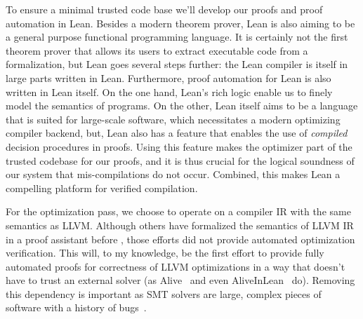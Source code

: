 \documentclass[a4paper]{scrartcl}
\begin{document}
To ensure a minimal trusted code base we'll develop our proofs and proof
automation in Lean. Besides a modern theorem prover, Lean is also aiming
to be a general purpose functional programming language. It is certainly
not the first theorem prover that allows its users to extract executable
code from a formalization, but Lean goes several steps further: the Lean
compiler is itself in large parts written in Lean. Furthermore, proof
automation for Lean is also written in Lean itself. On the one hand,
Lean's rich logic enable us to finely model the semantics of programs.
On the other, Lean itself aims to be a language that is suited for
large-scale software, which necessitates a modern optimizing compiler
backend, but, Lean also has a feature that enables the use of
\emph{compiled} decision procedures in proofs. Using this feature makes
the optimizer part of the trusted codebase for our proofs, and it is
thus crucial for the logical soundness of our system that
mis-compilations do not occur. Combined, this makes Lean a compelling
platform for verified compilation.

For the optimization pass, we choose to operate on a compiler IR with the same semantics as LLVM.
Although others have formalized the semantics of LLVM IR in a proof assistant before
\cite{zhaoFormalVerificationSSABased, zakowskiModularCompositionalExecutable2021}, those efforts
did not provide automated optimization verification. This will, to my knowledge, be the first
effort to provide fully automated proofs for correctness of LLVM
optimizations in a way that doesn't have to trust an external solver (as
Alive~\cite{lopesAlive2BoundedTranslation2021} and even AliveInLean~\cite{leeAliveInLeanVerifiedLLVM2019} do). Removing
this dependency is important as SMT solvers are large, complex pieces of
software with a history of bugs~\cite{brummayerFuzzingDeltadebuggingSMT2009, mansurDetectingCriticalBugs2020}.


\end{document}
